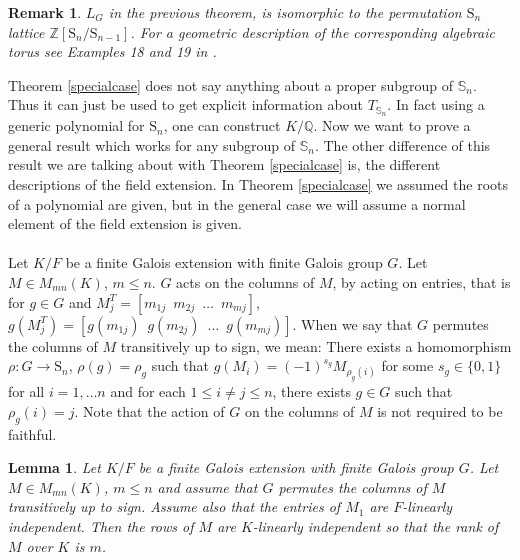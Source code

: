 \documentclass[12pt]{article}
\theoremstyle{plain}
\newtheorem{lemma}[theorem]{Lemma}
\newtheorem*{remark}{Remark}
\newcommand{\Z}{\ensuremath{\mathbb{Z}}}
\newcommand{\Q}{\ensuremath{\mathbb{Q}}}
\begin{document}
\begin{remark}
$L_G$ in the previous theorem, is isomorphic to the permutation $\mathrm{S}_n$ lattice $\Z[\mathrm{S}_n/\mathrm{S}_{n-1}]$. For a geometric description of the corresponding algebraic torus see Examples 18 and 19 in \cite{Voskresenskii}.

\end{remark}

Theorem \ref{specialcase} does not say anything about a proper subgroup of $\mathbb{S}_n$. Thus it can just be used to get explicit information about $T_{\mathbb{S}_n}$. In fact using a generic polynomial for $\mathrm{S}_n$, one can construct $K/\Q$. Now we want to prove a general result which works for any subgroup of $\mathbb{S}_n$. The other difference of this result we are talking about with Theorem \ref{specialcase} is, the different descriptions of the field extension. In Theorem \ref{specialcase} we assumed the roots of a polynomial are given, but in the general case we will assume a normal element of the field extension is given. \\
\\
Let $K/F$ be a finite Galois extension with finite Galois group $G$. Let $M \in M_{mn}(K)$, $m \leq n$. $G$ acts on the columns of $M$, by acting on entries, that is for $g \in G$ and $M^T_j = \left[m_{1j} \,\,\, m_{2j} \,\,\, \ldots \,\,\, m_{mj}\right]$, $g(M^T_j) = \left[g(m_{1j}) \,\,\, g(m_{2j}) \,\,\, \ldots \,\,\, g(m_{mj})\right]$. When we say that $G$ permutes the columns of $M$ transitively up to sign, we mean: There exists a homomorphism $\rho: G \longrightarrow \mathrm{S}_n$, $\rho(g) = \rho_g$ such that $g(M_i)= (-1)^{s_g}M_{\rho_g(i)}$ for some $s_g \in \lbrace 0, 1\rbrace$ for all $i = 1, \ldots n$ and for each $1 \leq i \neq j \leq n$, there exists $g \in G$ such that $\rho_g(i) = j$. Note that the action of $G$ on the columns of $M$ is not required to be faithful.
 \begin{lemma}\label{signdet}
Let $K/F$ be a finite Galois extension with finite Galois group $G$. Let $M \in M_{mn}(K)$, $m \leq n$ and assume that $G$ permutes the columns of $M$ transitively up to sign. Assume also that the entries of $M_1$ are $F$-linearly independent. Then the rows of $M$ are $K$-linearly independent so that the rank of $M$ over $K$ is $m$.
\end{lemma}
\end{document}
